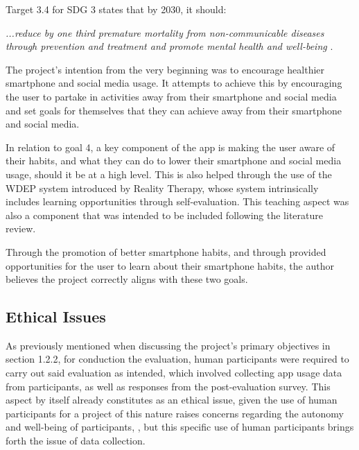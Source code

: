 \documentclass[12pt]{article}
\begin{document}
Target 3.4 for SDG 3 states that by 2030, it should:\newline

\textit{...reduce by one third premature mortality from non-communicable diseases through prevention and treatment and promote 
mental health and well-being} \autocite{globalgoals-goal3}.\newline

The project's intention from the very beginning was to encourage healthier smartphone and social media usage. It attempts to achieve this by encouraging the user to partake in activities
away from their smartphone and social media and set goals for themselves that they can achieve away from their smartphone and social media. \newline

In relation to goal 4, a key component of the app is making the user aware of their habits, and what they can do to lower their smartphone and social media usage, should it be at a high level. This is
also helped through the use of the WDEP system introduced by Reality Therapy, whose system intrinsically includes learning opportunities through self-evaluation. This teaching aspect was also a 
component that was intended to be included following the literature review. \newline

Through the promotion of better smartphone habits, and through provided opportunities for the user to learn about their smartphone habits, the author believes the project correctly aligns with
these two goals.

\subsection{Ethical Issues}

As previously mentioned when discussing the project's primary objectives in section 1.2.2, for conduction the evaluation, human participants were required to carry out said
evaluation as intended, which involved collecting app usage data from participants, as well as responses from the post-evaluation survey. 
This aspect by itself already constitutes as an ethical issue, given the use of human participants for a project
of this nature raises concerns regarding the autonomy and well-being of participants, \autocite{RefWorks:RefID:175-punchoojit2015research}, but 
this specific use of human participants brings forth the issue of data collection. \newline
\end{document}
